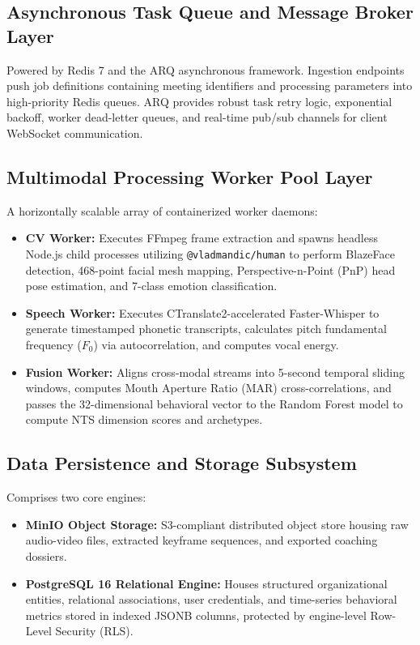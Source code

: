 \documentclass[12pt,a4paper,oneside]{report}
\begin{document}
\subsection{Asynchronous Task Queue and Message Broker Layer}
Powered by Redis 7 and the ARQ asynchronous framework. Ingestion endpoints push job definitions containing meeting identifiers and processing parameters into high-priority Redis queues. ARQ provides robust task retry logic, exponential backoff, worker dead-letter queues, and real-time pub/sub channels for client WebSocket communication.

\subsection{Multimodal Processing Worker Pool Layer}
A horizontally scalable array of containerized worker daemons:
\begin{itemize}
    \item \textbf{CV Worker:} Executes FFmpeg frame extraction and spawns headless Node.js child processes utilizing \texttt{@vladmandic/human} to perform BlazeFace detection, 468-point facial mesh mapping, Perspective-n-Point (PnP) head pose estimation, and 7-class emotion classification.
    \item \textbf{Speech Worker:} Executes CTranslate2-accelerated Faster-Whisper to generate timestamped phonetic transcripts, calculates pitch fundamental frequency ($F_0$) via autocorrelation, and computes vocal energy.
    \item \textbf{Fusion Worker:} Aligns cross-modal streams into 5-second temporal sliding windows, computes Mouth Aperture Ratio (MAR) cross-correlations, and passes the 32-dimensional behavioral vector to the Random Forest model to compute NTS dimension scores and archetypes.
\end{itemize}

\subsection{Data Persistence and Storage Subsystem}
Comprises two core engines:
\begin{itemize}
    \item \textbf{MinIO Object Storage:} S3-compliant distributed object store housing raw audio-video files, extracted keyframe sequences, and exported coaching dossiers.
    \item \textbf{PostgreSQL 16 Relational Engine:} Houses structured organizational entities, relational associations, user credentials, and time-series behavioral metrics stored in indexed JSONB columns, protected by engine-level Row-Level Security (RLS).
\end{itemize}
\end{document}
